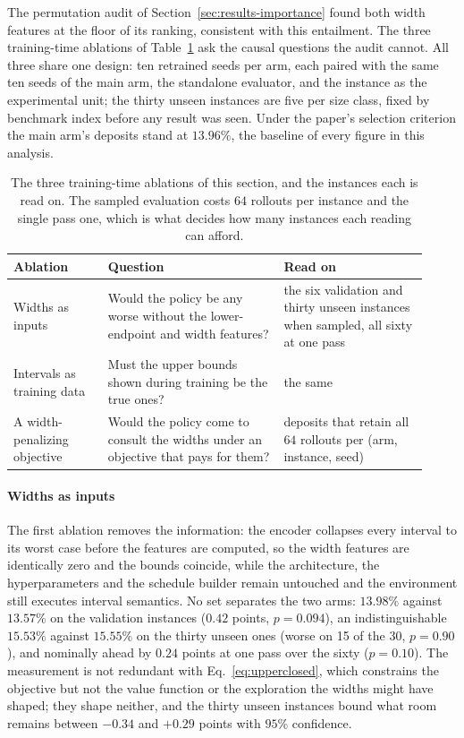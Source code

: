\documentclass[preprint,12pt]{elsarticle}
\theoremstyle{definition}
\theoremstyle{remark}
\begin{document}
The permutation audit of Section~\ref{sec:results-importance} found
both width features at the floor of its ranking, consistent with this
entailment. The three training-time ablations of
Table~\ref{tab:ablations} ask the causal questions the audit cannot.
All three share one design: ten retrained seeds per arm, each paired
with the same ten seeds of the main arm, the standalone evaluator,
and the instance as the experimental unit; the thirty unseen
instances are five per size class, fixed by benchmark index before
any result was seen. Under the paper's selection criterion the main
arm's deposits stand at $13.96\%$, the baseline of every figure in
this analysis.

\begin{table}[t]
\centering\small
\caption{The three training-time ablations of this section, and the
instances each is read on. The sampled evaluation costs $64$ rollouts
per instance and the single pass one, which is what decides how many
instances each reading can afford.}
\label{tab:ablations}
\setlength{\tabcolsep}{4pt}
\renewcommand{\arraystretch}{1.2}
\begin{tabular}{@{}p{0.21\linewidth}p{0.39\linewidth}p{0.32\linewidth}@{}}
\toprule
Ablation & Question & Read on \\
\midrule
Widths as inputs &
Would the policy be any worse without the lower-endpoint and
width features? &
the six validation and thirty unseen instances when sampled, all
sixty at one pass \\
Intervals as training data &
Must the upper bounds shown during training be the true ones? &
the same \\
A width-penalizing objective &
Would the policy come to consult the widths under an objective that
pays for them? &
deposits that retain all $64$ rollouts per (arm, instance, seed) \\
\bottomrule
\end{tabular}
\end{table}

\paragraph{Widths as inputs} The first ablation removes the
information: the encoder collapses every interval to its worst case
before the features are computed, so the width features are
identically zero and the bounds coincide, while the architecture, the
hyperparameters and the schedule builder remain untouched and the
environment still executes interval semantics. No set separates the
two arms: $13.98\%$ against $13.57\%$ on the validation instances
($0.42$ points, $p=0.094$), an indistinguishable $15.53\%$ against
$15.55\%$ on the thirty unseen ones (worse on 15 of the 30,
$p=0.90$), and nominally ahead by $0.24$ points at one pass over the
sixty ($p=0.10$). The measurement is not redundant with
Eq.~\eqref{eq:upperclosed}, which constrains the objective but not
the value function or the exploration the widths might have shaped;
they shape neither, and the thirty unseen instances bound what room
remains between $-0.34$ and $+0.29$ points with $95\%$ confidence.
\end{document}
